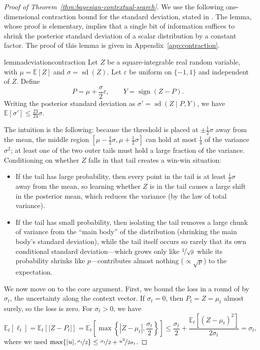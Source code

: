 \documentclass[11pt]{article}
\newcommand{\E}[1]{\mathbb E\left[#1\right]}
\newcommand{\Esub}[2]{\mathbb E_{#1}\left[#2\right]}
\DeclareMathOperator{\sd}{sd}
\begin{document}
\begin{proof}[Proof of Theorem~\ref{thm:bayesian-contextual-search}]
  {We use the following one-dimensional contraction bound for the standard deviation, stated in .} The lemma,
  whose proof is elementary, implies that a single bit of information
  suffices to shrink the posterior standard deviation of a scalar
  distribution by a constant factor. The proof of this lemma is given
  in Appendix~\ref{app:contraction}.

\begin{restatable}{lemma}{deviationcontraction}\label{lem:deviation-contraction}
Let $Z$ be a square-integrable real random variable, with $\mu=\E{Z}$ and $\sigma=\sd(Z)$. Let $\varepsilon$ be uniform on $\{-1,1\}$ and independent of $Z$. {Define} 
\[
 P=\mu+\frac\sigma2\varepsilon,
 \qquad Y=\operatorname{sign}(Z-P).
\]
{Writing the posterior standard deviation as} $\sigma'=\sd(Z\mid P,Y)$, we have
\(
\E{\sigma'}\le\frac{23}{24}\sigma.
\)
\end{restatable}
The intuition is the following: because the threshold is placed at $\pm \frac{1}{2}\sigma$ away from the mean, the middle region ${[\mu-\frac{1}{2}\sigma, \mu+\frac{1}{2}\sigma]}$ can hold at most $\frac{1}{4}$ of the variance $\sigma^2$; at least one of the two outer tails must hold a large fraction of the variance. Conditioning on whether $Z$ falls in that tail creates {a win-win situation:}
\begin{itemize}
    \item If the tail has large probability, then every point in the tail is at least $\frac{1}{2}\sigma$ away from the mean, so learning whether $Z$ is in the tail causes a large shift in the posterior mean, which reduces the variance (by the law of total variance).
\item If the tail has small probability, then isolating the tail removes a large chunk of variance from the ``main body'' of the distribution (shrinking the main body's standard deviation), while the tail itself {occurs} so rarely that its own conditional standard deviation—which grows only like $\nicefrac{1}{\sqrt{p}}$ while its probability shrinks like $p$—contributes almost nothing ($\propto \sqrt{p}$) to the expectation.
\end{itemize}

We now move on to the core argument. First, we bound the loss in a round of  by $\sigma_t$, the uncertainty along the context vector{. If $\sigma_t=0$, then $P_t=Z=\mu_t$ almost surely, so the loss is zero. For $\sigma_t>0$, we have}
\[
 \Esub{t}{\ell_t}
 =\Esub{t}{|Z-P_t|}=\Esub{t}{\max\left\{|Z-\mu_t|,\frac{\sigma_t}{2}\right\}}
 \le\frac{\sigma_t}{2}+\frac{\Esub{t}{(Z-\mu_t)^2}}{2\sigma_t}
 =\sigma_t,
\]
where we used $\max\{|u|,\nicefrac{\sigma_t}2\}\le\nicefrac{\sigma_t}2+\nicefrac{u^2}{2\sigma_t}$. 


\end{proof}
\end{document}
